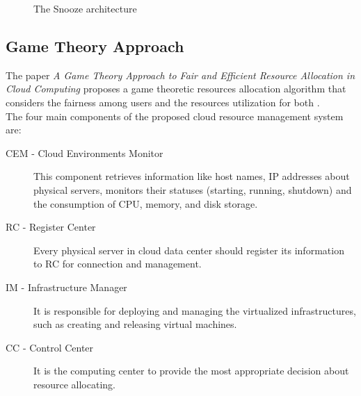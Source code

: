 \begin{figure}[!ht]
\label{fig:snooze_arch}
\caption{The Snooze architecture \cite{Feller:2012kf}}
\end{figure}

\subsection{Game Theory Approach}
\label{sec:sota_game_theroy}
The paper \textit{A Game Theory Approach to Fair and Efficient Resource Allocation in Cloud Computing} proposes a game theoretic resources allocation algorithm that considers the fairness among users and the resources utilization for both \cite{Xu:2014do}.\\
The four main components of the proposed cloud resource management system are:
\begin{description}
  \item[CEM - Cloud Environments Monitor] This component retrieves information like host names, IP addresses about physical servers, monitors their statuses (starting, running, shutdown) and the consumption of CPU, memory, and disk storage.
  \item[RC - Register Center] Every physical server in cloud data center should register its information to RC for connection and management.
  \item[IM - Infrastructure Manager] It is responsible for deploying and managing the virtualized infrastructures, such as creating and releasing virtual machines.
  \item[CC - Control Center] It is the computing center to provide the most appropriate decision about resource allocating.
\end{description}

